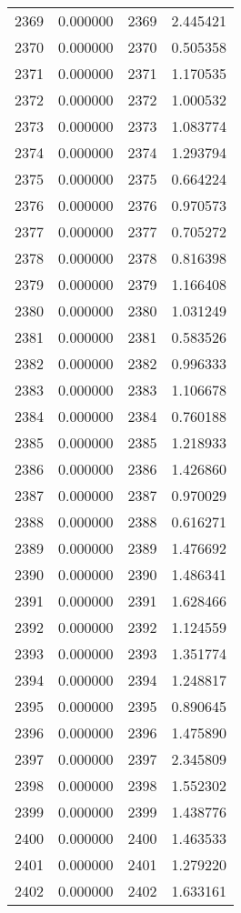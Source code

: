\documentclass[12pt]{article}
\begin{document}
\begin{longtable}{@{}cccc@{}}
2369 & 0.000000 & 2369 & 2.445421 \\
2370 & 0.000000 & 2370 & 0.505358 \\
2371 & 0.000000 & 2371 & 1.170535 \\
2372 & 0.000000 & 2372 & 1.000532 \\
2373 & 0.000000 & 2373 & 1.083774 \\
2374 & 0.000000 & 2374 & 1.293794 \\
2375 & 0.000000 & 2375 & 0.664224 \\
2376 & 0.000000 & 2376 & 0.970573 \\
2377 & 0.000000 & 2377 & 0.705272 \\
2378 & 0.000000 & 2378 & 0.816398 \\
2379 & 0.000000 & 2379 & 1.166408 \\
2380 & 0.000000 & 2380 & 1.031249 \\
2381 & 0.000000 & 2381 & 0.583526 \\
2382 & 0.000000 & 2382 & 0.996333 \\
2383 & 0.000000 & 2383 & 1.106678 \\
2384 & 0.000000 & 2384 & 0.760188 \\
2385 & 0.000000 & 2385 & 1.218933 \\
2386 & 0.000000 & 2386 & 1.426860 \\
2387 & 0.000000 & 2387 & 0.970029 \\
2388 & 0.000000 & 2388 & 0.616271 \\
2389 & 0.000000 & 2389 & 1.476692 \\
2390 & 0.000000 & 2390 & 1.486341 \\
2391 & 0.000000 & 2391 & 1.628466 \\
2392 & 0.000000 & 2392 & 1.124559 \\
2393 & 0.000000 & 2393 & 1.351774 \\
2394 & 0.000000 & 2394 & 1.248817 \\
2395 & 0.000000 & 2395 & 0.890645 \\
2396 & 0.000000 & 2396 & 1.475890 \\
2397 & 0.000000 & 2397 & 2.345809 \\
2398 & 0.000000 & 2398 & 1.552302 \\
2399 & 0.000000 & 2399 & 1.438776 \\
2400 & 0.000000 & 2400 & 1.463533 \\
2401 & 0.000000 & 2401 & 1.279220 \\
2402 & 0.000000 & 2402 & 1.633161 \\

\end{longtable}
\end{document}
